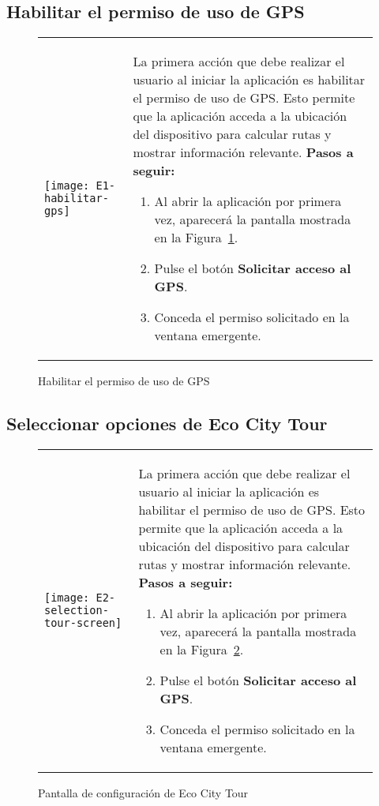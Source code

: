 \subsection{Habilitar el permiso de uso de GPS}
\begin{figure}[h!]
	\centering
	\begin{tabular}{m{} m{}}
		\texttt{[image: E1-habilitar-gps]} & 
		\vspace{-10pt}
		
			La primera acción que debe realizar el usuario al iniciar la aplicación es habilitar el permiso de uso de GPS. Esto permite que la aplicación acceda a la ubicación del dispositivo para calcular rutas y mostrar información relevante.
			\textbf{Pasos a seguir:}
			\begin{enumerate}
				\item Al abrir la aplicación por primera vez, aparecerá la pantalla mostrada en la Figura~\ref{fig:habilitarGPS}.
				\item Pulse el botón \textbf{Solicitar acceso al GPS}.
				\item Conceda el permiso solicitado en la ventana emergente.
			\end{enumerate}		
	\end{tabular}
	\caption{Habilitar el permiso de uso de GPS}
	\label{fig:habilitarGPS}
\end{figure}
\newpage
\subsection{Seleccionar opciones de Eco City Tour}
\begin{figure}[h!]
	\centering
	\begin{tabular}{m{} m{}}
		\texttt{[image: E2-selection-tour-screen]} &		
		
		La primera acción que debe realizar el usuario al iniciar la aplicación es habilitar el permiso de uso de GPS. Esto permite que la aplicación acceda a la ubicación del dispositivo para calcular rutas y mostrar información relevante.
		\textbf{Pasos a seguir:}
		\begin{enumerate}
			\item Al abrir la aplicación por primera vez, aparecerá la pantalla mostrada en la Figura~\ref{fig:selectionTourScreen}.
			\item Pulse el botón \textbf{Solicitar acceso al GPS}.
			\item Conceda el permiso solicitado en la ventana emergente.
		\end{enumerate}		
	\end{tabular}
	\caption{Pantalla de configuración de Eco City Tour}
	\label{fig:selectionTourScreen}
\end{figure}
